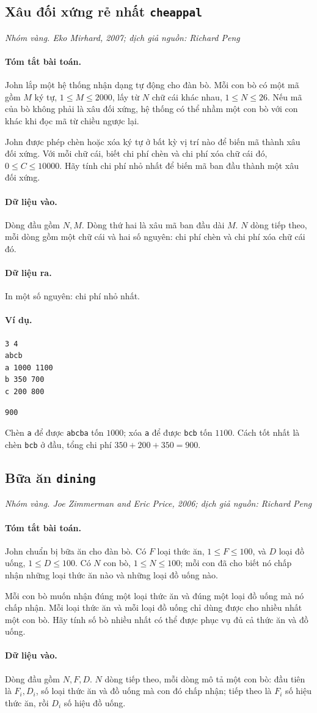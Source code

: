 \documentclass[11pt]{article}
\newcommand{\problem}[4]{%
  \subsection[#1 (#2)]{#1 \hfill {\normalsize\texttt{#2}}}%
  \noindent\textit{#3. #4}\par\smallskip
}
\newcommand{\iosec}[1]{\paragraph{#1}}
\begin{document}
\problem{Xâu đối xứng rẻ nhất}{cheappal}{Nhóm vàng}{Eko Mirhard, 2007; dịch giả nguồn: Richard Peng}

\iosec{Tóm tắt bài toán.}
John lắp một hệ thống nhận dạng tự động cho đàn bò. Mỗi con bò có một mã gồm
\(M\) ký tự, \(1\le M\le 2000\), lấy từ \(N\) chữ cái khác nhau,
\(1\le N\le 26\). Nếu mã của bò không phải là xâu đối xứng, hệ thống có thể
nhầm một con bò với con khác khi đọc mã từ chiều ngược lại.

John được phép chèn hoặc xóa ký tự ở bất kỳ vị trí nào để biến mã thành xâu
đối xứng. Với mỗi chữ cái, biết chi phí chèn và chi phí xóa chữ cái đó,
\(0\le C\le 10000\). Hãy tính chi phí nhỏ nhất để biến mã ban đầu thành một
xâu đối xứng.

\iosec{Dữ liệu vào.}
Dòng đầu gồm \(N,M\). Dòng thứ hai là xâu mã ban đầu dài \(M\). \(N\) dòng
tiếp theo, mỗi dòng gồm một chữ cái và hai số nguyên: chi phí chèn và chi phí
xóa chữ cái đó.

\iosec{Dữ liệu ra.}
In một số nguyên: chi phí nhỏ nhất.

\iosec{Ví dụ.}
\begin{verbatim}
3 4
abcb
a 1000 1100
b 350 700
c 200 800
\end{verbatim}

\begin{verbatim}
900
\end{verbatim}

Chèn \texttt{a} để được \texttt{abcba} tốn \(1000\); xóa \texttt{a} để được
\texttt{bcb} tốn \(1100\). Cách tốt nhất là chèn \texttt{bcb} ở đầu, tổng
chi phí \(350+200+350=900\).

\problem{Bữa ăn}{dining}{Nhóm vàng}{Joe Zimmerman and Eric Price, 2006; dịch giả nguồn: Richard Peng}

\iosec{Tóm tắt bài toán.}
John chuẩn bị bữa ăn cho đàn bò. Có \(F\) loại thức ăn,
\(1\le F\le 100\), và \(D\) loại đồ uống, \(1\le D\le 100\). Có \(N\) con bò,
\(1\le N\le 100\); mỗi con đã cho biết nó chấp nhận những loại thức ăn nào và
những loại đồ uống nào.

Mỗi con bò muốn nhận đúng một loại thức ăn và đúng một loại đồ uống mà nó
chấp nhận. Mỗi loại thức ăn và mỗi loại đồ uống chỉ dùng được cho nhiều nhất
một con bò. Hãy tính số bò nhiều nhất có thể được phục vụ đủ cả thức ăn và đồ
uống.

\iosec{Dữ liệu vào.}
Dòng đầu gồm \(N,F,D\). \(N\) dòng tiếp theo, mỗi dòng mô tả một con bò: đầu
tiên là \(F_i,D_i\), số loại thức ăn và đồ uống mà con đó chấp nhận; tiếp theo
là \(F_i\) số hiệu thức ăn, rồi \(D_i\) số hiệu đồ uống.
\end{document}
